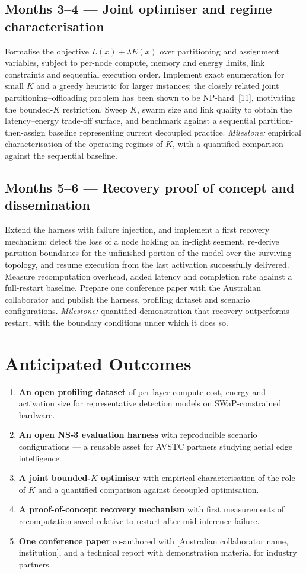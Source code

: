 \documentclass[11pt,a4paper]{article}
\newcommand{\AusCollaborator}{[Australian collaborator name, institution]}
\begin{document}
\subsection{Months 3--4 --- Joint optimiser and regime characterisation}
Formalise the objective $L(x) + \lambda E(x)$ over partitioning and assignment variables, subject to per-node compute, memory and energy limits, link constraints and sequential execution order. Implement exact enumeration for small $K$ and a greedy heuristic for larger instances; the closely related joint partitioning--offloading problem has been shown to be NP-hard~[11], motivating the bounded-$K$ restriction. Sweep $K$, swarm size and link quality to obtain the latency--energy trade-off surface, and benchmark against a sequential partition-then-assign baseline representing current decoupled practice. \emph{Milestone:} empirical characterisation of the operating regimes of $K$, with a quantified comparison against the sequential baseline.

\subsection{Months 5--6 --- Recovery proof of concept and dissemination}
Extend the harness with failure injection, and implement a first recovery mechanism: detect the loss of a node holding an in-flight segment, re-derive partition boundaries for the unfinished portion of the model over the surviving topology, and resume execution from the last activation successfully delivered. Measure recomputation overhead, added latency and completion rate against a full-restart baseline. Prepare one conference paper with the Australian collaborator and publish the harness, profiling dataset and scenario configurations. \emph{Milestone:} quantified demonstration that recovery outperforms restart, with the boundary conditions under which it does so.

\section{Anticipated Outcomes}

\begin{enumerate}
  \item \textbf{An open profiling dataset} of per-layer compute cost, energy and activation size for representative detection models on SWaP-constrained hardware.
  \item \textbf{An open NS-3 evaluation harness} with reproducible scenario configurations --- a reusable asset for AVSTC partners studying aerial edge intelligence.
  \item \textbf{A joint bounded-$K$ optimiser} with empirical characterisation of the role of $K$ and a quantified comparison against decoupled optimisation.
  \item \textbf{A proof-of-concept recovery mechanism} with first measurements of recomputation saved relative to restart after mid-inference failure.
  \item \textbf{One conference paper} co-authored with \AusCollaborator, and a technical report with demonstration material for industry partners.
\end{enumerate}
\end{document}
